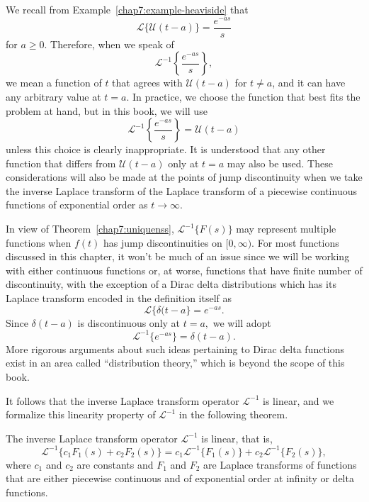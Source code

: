 We recall from Example~\ref{chap7:example-heaviside} that 
\[\mathscr{L}\{ \mathcal{U}(t-a)\}= \frac{e^{-as}}{s}\]  for $a\ge 0.$ Therefore, when we speak of
\[\mathscr{L}^{-1}\left\{\frac{e^{-as}}{s}\right\},\] we mean a function of $t$ that agrees with $\mathcal{U}(t-a)$ for $t\ne a$, and it can have any arbitrary value at $t=a.$ In practice, we choose the function that best fits the problem at hand, but in this book, we will use  
\[
\mathscr{L}^{-1}\left\{\frac{e^{-as}}{s}\right\} = \mathcal{U}(t - a)
\]  
unless this choice is clearly inappropriate. It is understood that any other  function that differs from \(\mathcal{U}(t - a)\)  only at \(t = a\) may also be used. These considerations will also be made at the points of jump discontinuity when we take the inverse Laplace transform of the Laplace transform of a piecewise continuous functions of exponential order as $t\to\infty.$


 In view of Theorem~\ref{chap7:uniquenss},  $\mathscr{L}^{-1}\{F(s)\}$ may represent multiple functions when $f(t)$ has jump discontinuities on $[0,\infty)$. For most functions discussed in this chapter, it won't be  much of an issue since we will be working with either  continuous functions or, at worse,  functions that have finite number of discontinuity, with the exception of a Dirac delta distributions which has its Laplace transform  encoded in the definition itself as
 \[ \mathscr{L}\{\delta(t - a\} =e^{-as}. 
\]
Since $\delta(t-a)$ is discontinuous only at $t=a,$ we will adopt 
\[
\mathscr{L}^{-1}\{e^{-as}\} =\delta(t - a).\]
 More rigorous arguments about such ideas pertaining to Dirac delta functions exist in an area called ``distribution theory,'' which is beyond the scope of this book.
 
 It  follows that the inverse Laplace transform  operator \(\mathscr{L}^{-1}\) is linear, and we formalize this linearity property of \(\mathscr{L}^{-1}\) in the following theorem.
 
 \begin{theorem}
 	The inverse Laplace transform operator \(\mathscr{L}^{-1}\) is linear, that is, 
 	\[\mathscr{L}^{-1}\{c_1F_1(s)+ c_2 F_2(s)\}= c_1\mathscr{L}^{-1}\{F_1(s)\} +c_2 \mathscr{L}^{-1}\{F_2(s)\},\] where $c_1$ and $c_2$ are constants and $F_1$ and $F_2$ are  Laplace transforms of functions that are either piecewise continuous and of exponential order at infinity or delta functions. 
 \end{theorem}
 
 
 

